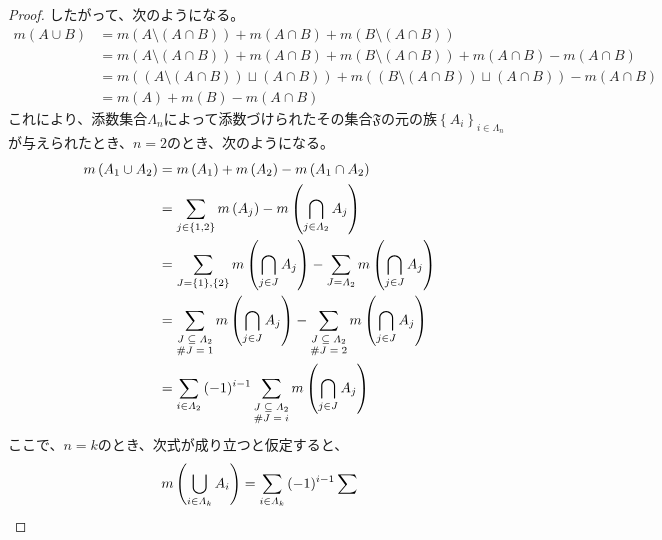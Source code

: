 \documentclass[dvipdfmx]{jsarticle}
\begin{document}
\begin{proof}
したがって、次のようになる。
\begin{align*}
m(A \cup B) &= m\left( A \setminus (A \cap B) \right) + m(A \cap B) + m\left( B \setminus (A \cap B) \right)\\
&= m\left( A \setminus (A \cap B) \right) + m(A \cap B) + m\left( B \setminus (A \cap B) \right) + m(A \cap B) - m(A \cap B)\\
&= m\left( \left( A \setminus (A \cap B) \right) \sqcup (A \cap B) \right) + m\left( \left( B \setminus (A \cap B) \right) \sqcup (A \cap B) \right) - m(A \cap B)\\
&= m(A) + m(B) - m(A \cap B)
\end{align*}
これにより、添数集合$\varLambda_{n}$によって添数づけられたその集合$\mathfrak{F}$の元の族$\left\{ A_{i} \right\}_{i \in \varLambda_{n} }$が与えられたとき、$n = 2$のとき、次のようになる。
\begin{align*}
m\left( A_{1} \cup A_{2} \right) &= m\left( A_{1} \right) + m\left( A_{2} \right) - m\left( A_{1} \cap A_{2} \right)\\
&= \sum_{j \in \left\{ 1,2 \right\} } {m\left( A_{j} \right)} - m\left( \bigcap_{j \in \varLambda_{2}} A_{j} \right)\\
&= \sum_{J = \left\{ 1 \right\},\left\{ 2 \right\} } {m\left( \bigcap_{j \in J} A_{j} \right)} - \sum_{J = \varLambda_{2} } {m\left( \bigcap_{j \in J} A_{j} \right)}\\
&= \sum_{\scriptsize \begin{matrix}
J \subseteq \varLambda_{2} \\
\#J = 1 \\
\end{matrix}} {m\left( \bigcap_{j \in J} A_{j} \right)} - \sum_{\scriptsize \begin{matrix}
J \subseteq \varLambda_{2} \\
\#J = 2 \\
\end{matrix}} {m\left( \bigcap_{j \in J} A_{j} \right)}\\
&= \sum_{i \in \varLambda_{2}} {( - 1)^{i - 1}\sum_{\scriptsize \begin{matrix}
J \subseteq \varLambda_{2} \\
\#J = i \\
\end{matrix}} {m\left( \bigcap_{j \in J} A_{j} \right)}}
\end{align*}
ここで、$n = k$のとき、次式が成り立つと仮定すると、
\begin{align*}
m\left( \bigcup_{i \in \varLambda_{k}} A_{i} \right) = \sum_{i \in \varLambda_{k} } {( - 1)^{i - 1}\sum_{\scriptsize \begin{matrix}

\end{matrix}}}
\end{align*}
\end{proof}
\end{document}
